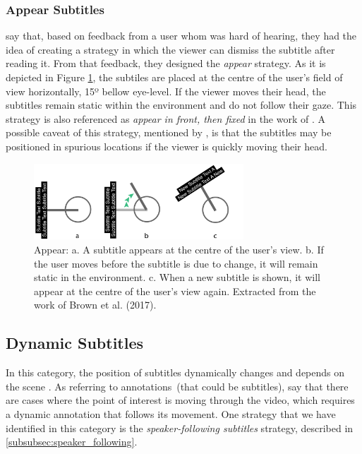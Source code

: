 \subsubsection{Appear Subtitles}
\label{subsubsection:appear_subtitles}

 say that, based on feedback from a user whom was hard of hearing, they had the idea of creating a strategy in which the viewer can dismiss the subtitle after reading it. From that feedback, they designed the \emph{appear} strategy. As it is depicted in Figure \ref{fig:appear_subtitle}, the subtiles are placed at the centre of the user's field of view horizontally, 15º bellow eye-level. If the viewer moves their head, the subtitles remain static within the environment and do not follow their gaze. This strategy is also referenced as \emph{appear in front, then fixed} in the work of . A possible caveat of this strategy, mentioned by , is that the subtitles may be positioned in spurious locations if the viewer is quickly moving their head.

\begin{figure}[!ht]
    \centering
    \includegraphics[width=0.7\textwidth]{img/appear.png}
    \caption{Appear: a. A subtitle appears at the centre of the user's view. b. If the user moves before the subtitle is due to change, it will remain static in the environment. c. When a new subtitle is shown, it will appear at the centre of the user's view again. Extracted from the work of Brown et al. (2017).}
    \label{fig:appear_subtitle}
\end{figure}

\subsection{Dynamic Subtitles}
\label{subsection:dynamic_subtitles}

In this category, the position of subtitles dynamically changes and depends on the scene \cite{rothe_dynamic_2018}. As referring to annotations~(that could be subtitles),  say that there are cases where the point of interest is moving through the video, which requires a dynamic annotation that follows its movement. One strategy that we have identified in this category is the \emph{speaker-following subtitles} strategy, described in \ref{subsubsec:speaker_following}.

